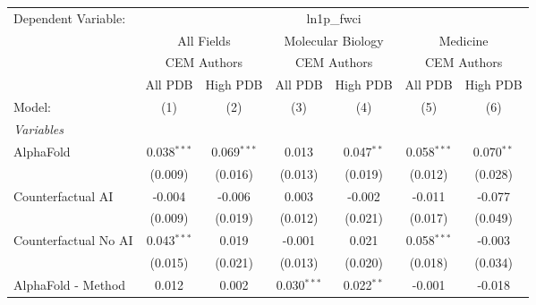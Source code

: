 \begingroup
\centering
\begin{tabular}{lcccccc}
   \tabularnewline \midrule \midrule
   Dependent Variable: & \multicolumn{6}{c}{ln1p\_fwci}\\
 & \multicolumn{2}{c}{All Fields} & \multicolumn{2}{c}{Molecular Biology} & \multicolumn{2}{c}{Medicine} \\
\cmidrule(lr){2-3} \cmidrule(lr){4-5} \cmidrule(lr){6-7}
 & \multicolumn{2}{c}{CEM Authors} & \multicolumn{2}{c}{CEM Authors} & \multicolumn{2}{c}{CEM Authors} \\
\cmidrule(lr){2-3} \cmidrule(lr){4-5} \cmidrule(lr){6-7}
 & \multicolumn{1}{c}{All PDB} & \multicolumn{1}{c}{High PDB} & \multicolumn{1}{c}{All PDB} & \multicolumn{1}{c}{High PDB} & \multicolumn{1}{c}{All PDB} & \multicolumn{1}{c}{High PDB} \\
\cmidrule(lr){2-2} \cmidrule(lr){3-3} \cmidrule(lr){4-4} \cmidrule(lr){5-5} \cmidrule(lr){6-6} \cmidrule(lr){7-7}
   Model:                                                     & (1)            & (2)           & (3)            & (4)            & (5)           & (6)\\  
   \midrule
   \emph{Variables}\\
   AlphaFold                                                  & 0.038$^{***}$  & 0.069$^{***}$ & 0.013          & 0.047$^{**}$   & 0.058$^{***}$ & 0.070$^{**}$\\   
                                                              & (0.009)        & (0.016)       & (0.013)        & (0.019)        & (0.012)       & (0.028)\\   
   Counterfactual AI                                          & -0.004         & -0.006        & 0.003          & -0.002         & -0.011        & -0.077\\   
                                                              & (0.009)        & (0.019)       & (0.012)        & (0.021)        & (0.017)       & (0.049)\\   
   Counterfactual No AI                                       & 0.043$^{***}$  & 0.019         & -0.001         & 0.021          & 0.058$^{***}$ & -0.003\\   
                                                              & (0.015)        & (0.021)       & (0.013)        & (0.020)        & (0.018)       & (0.034)\\   
   AlphaFold - Method                                         & 0.012          & 0.002         & 0.030$^{***}$  & 0.022$^{**}$   & -0.001        & -0.018\\   

\end{tabular}
